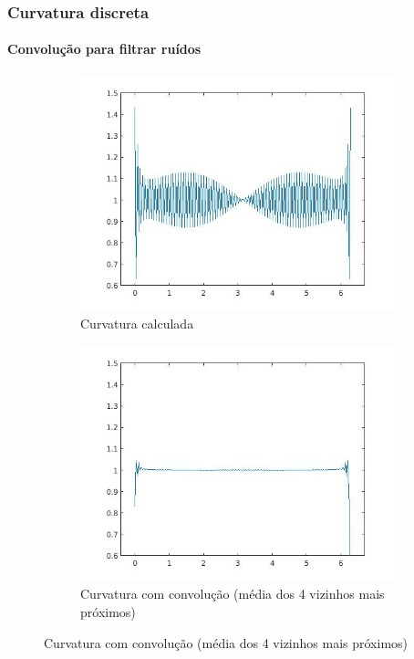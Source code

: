 \begin{frame}
	\frametitle{Curvatura discreta}
	\framesubtitle{Convolução para filtrar ruídos}
	
	\begin{center}
		\begin{figure}
			\centering
			\begin{subfigure}[b]{0.49\textwidth}
				\centering
				\includegraphics[width=\textwidth]{img/curvatura_calc.jpg}
				\caption{Curvatura calculada}
				\label{fig:cacurv}
				\bigskip
			\end{subfigure}
			\hfill
			\begin{subfigure}[b]{0.49\textwidth}
				\centering
				\includegraphics[width=\textwidth]{img/curvatura_arr.jpg}
				\caption{Curvatura com convolução (média dos 4 vizinhos mais próximos)}
				\label{fig:arrara}
			\end{subfigure}
		\end{figure}
	\end{center}
	
\end{frame}
